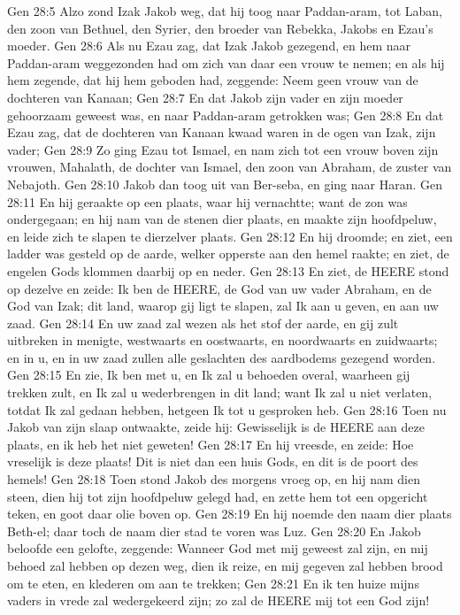 Gen 28:5  Alzo zond Izak Jakob weg, dat hij toog naar Paddan-aram, tot Laban, den zoon van Bethuel, den Syrier, den broeder van Rebekka, Jakobs en Ezau's moeder.
Gen 28:6  Als nu Ezau zag, dat Izak Jakob gezegend, en hem naar Paddan-aram weggezonden had om zich van daar een vrouw te nemen; en als hij hem zegende, dat hij hem geboden had, zeggende: Neem geen vrouw van de dochteren van Kanaan;
Gen 28:7  En dat Jakob zijn vader en zijn moeder gehoorzaam geweest was, en naar Paddan-aram getrokken was;
Gen 28:8  En dat Ezau zag, dat de dochteren van Kanaan kwaad waren in de ogen van Izak, zijn vader;
Gen 28:9  Zo ging Ezau tot Ismael, en nam zich tot een vrouw boven zijn vrouwen, Mahalath, de dochter van Ismael, den zoon van Abraham, de zuster van Nebajoth.
Gen 28:10  Jakob dan toog uit van Ber-seba, en ging naar Haran.
Gen 28:11  En hij geraakte op een plaats, waar hij vernachtte; want de zon was ondergegaan; en hij nam van de stenen dier plaats, en maakte zijn hoofdpeluw, en leide zich te slapen te dierzelver plaats.
Gen 28:12  En hij droomde; en ziet, een ladder was gesteld op de aarde, welker opperste aan den hemel raakte; en ziet, de engelen Gods klommen daarbij op en neder.
Gen 28:13  En ziet, de HEERE stond op dezelve en zeide: Ik ben de HEERE, de God van uw vader Abraham, en de God van Izak; dit land, waarop gij ligt te slapen, zal Ik aan u geven, en aan uw zaad.
Gen 28:14  En uw zaad zal wezen als het stof der aarde, en gij zult uitbreken in menigte, westwaarts en oostwaarts, en noordwaarts en zuidwaarts; en in u, en in uw zaad zullen alle geslachten des aardbodems gezegend worden.
Gen 28:15  En zie, Ik ben met u, en Ik zal u behoeden overal, waarheen gij trekken zult, en Ik zal u wederbrengen in dit land; want Ik zal u niet verlaten, totdat Ik zal gedaan hebben, hetgeen Ik tot u gesproken heb.
Gen 28:16  Toen nu Jakob van zijn slaap ontwaakte, zeide hij: Gewisselijk is de HEERE aan deze plaats, en ik heb het niet geweten!
Gen 28:17  En hij vreesde, en zeide: Hoe vreselijk is deze plaats! Dit is niet dan een huis Gods, en dit is de poort des hemels!
Gen 28:18  Toen stond Jakob des morgens vroeg op, en hij nam dien steen, dien hij tot zijn hoofdpeluw gelegd had, en zette hem tot een opgericht teken, en goot daar olie boven op.
Gen 28:19  En hij noemde den naam dier plaats Beth-el; daar toch de naam dier stad te voren was Luz.
Gen 28:20  En Jakob beloofde een gelofte, zeggende: Wanneer God met mij geweest zal zijn, en mij behoed zal hebben op dezen weg, dien ik reize, en mij gegeven zal hebben brood om te eten, en klederen om aan te trekken;
Gen 28:21  En ik ten huize mijns vaders in vrede zal wedergekeerd zijn; zo zal de HEERE mij tot een God zijn!
